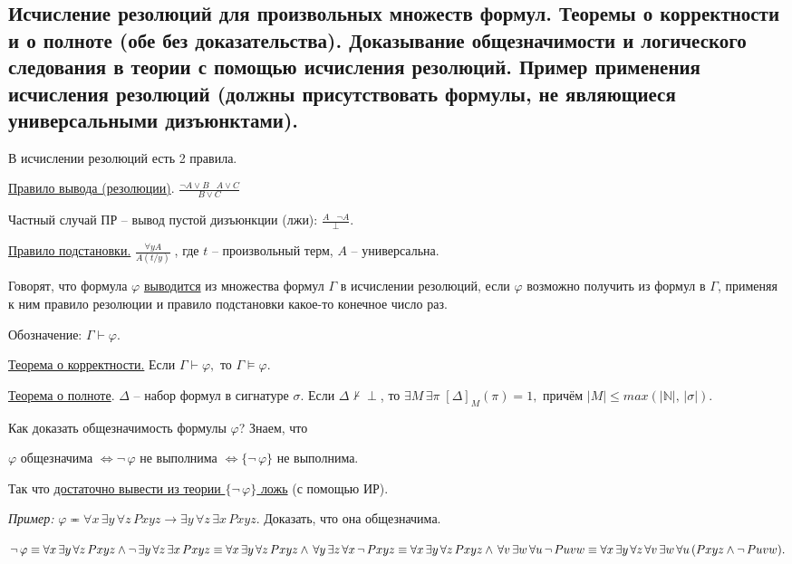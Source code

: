 \documentclass[a4paper, fleqn]{article}
\begin{document}
    \subsection{Исчисление резолюций для произвольных множеств формул. Теоремы о корректности и о полноте (обе без доказательства). Доказывание общезначимости и логического следования в теории с помощью исчисления резолюций. Пример применения исчисления резолюций (должны присутствовать формулы, не являющиеся универсальными дизъюнктами).}
    
    В исчислении резолюций есть 2 правила.
    
    \underline{Правило вывода (резолюции)}. $\boxed{\frac{\neg A \lor B \; \; \; A \lor C}{B \lor C} } $
    
    Частный случай ПР -- вывод пустой дизъюнкции (лжи): $\frac{A \; \; \; \neg A}{\perp}.$
    
    \underline{Правило подстановки.} $\boxed{\frac{\forall y A}{A(t/y)}} \; $, где $t$ -- произвольный терм, $A$ -- универсальна.
    
    Говорят, что формула $\varphi$ \underline{выводится} из множества  формул $\Gamma$ в исчислении резолюций, если $\varphi$ возможно получить из формул в $\Gamma$, применяя к ним правило резолюции и правило подстановки какое-то конечное число раз.
    
    Обозначение: $\Gamma \vdash \varphi.$
    
    \underline{Теорема о корректности.} Если $\Gamma \vdash \varphi,$ то $\Gamma \vDash \varphi.$
    
    \underline{Теорема о полноте}. $\Delta$ -- набор формул в сигнатуре $\sigma$. Если $\Delta \nvdash \perp$, то $\exists M \, \exists \pi \; [\Delta]_M (\pi) = 1,$ причём $|M| \leq max(|\mathbb{N}|, \, | \sigma|). $
    
    Как доказать общезначимость формулы $\varphi$? Знаем, что 
    
    $\varphi$ общезначима $\iff \neg \, \varphi$ не выполнима $\iff \{ \neg \, \varphi\}$ не выполнима. 
    
    Так что \underline{достаточно вывести из теории $\{ \neg \, \varphi\}$ ложь} (с помощью ИР).
    
    \textit{Пример:} $\varphi \eqcirc \forall x \, \exists y \, \forall z \, Pxyz \to \exists y \, \forall z \, \exists x  \, Pxyz.$ Доказать, что она общезначима.
    
    $\neg \, \varphi \equiv \forall x \, \exists y \, \forall z \, Pxyz \land \neg \, \exists y \, \forall z \, \exists x  \, Pxyz \equiv \forall x \, \exists y \, \forall z \, Pxyz \land  \, \forall y \, \exists z \, \forall x  \, \neg \, Pxyz \equiv \forall x \, \exists y \, \forall z \, Pxyz \land  \, \forall v \, \exists w \, \forall u  \, \neg \, Puvw \equiv \\ \\ \forall x \, \exists y \, \forall z  \, \forall v \, \exists w \, \forall u \, (Pxyz \land  \neg \, Puvw).$ 
    
\end{document}
